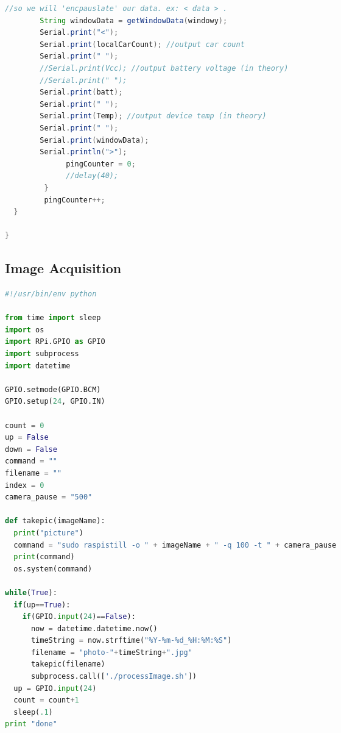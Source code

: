 \documentclass[11pt, oneside, fullpage, doublespace]{article}
\begin{document}
\begin{spacing}{1}
\begin{lstlisting}[language=java]
        //so we will 'encpauslate' our data. ex: < data > .
        String windowData = getWindowData(windowy);
        Serial.print("<");
        Serial.print(localCarCount); //output car count
        Serial.print(" ");
        //Serial.print(Vcc); //output battery voltage (in theory)
        //Serial.print(" ");
        Serial.print(batt);
        Serial.print(" ");
        Serial.print(Temp); //output device temp (in theory)
        Serial.print(" ");
        Serial.print(windowData);
        Serial.println(">");
              pingCounter = 0;
              //delay(40);
         }
         pingCounter++;  
  }

}
\end{lstlisting}
\end{spacing}

\subsection*{Image Acquisition}
\begin{spacing}{1}
\begin{lstlisting}[language=python]
#!/usr/bin/env python

from time import sleep
import os
import RPi.GPIO as GPIO
import subprocess
import datetime

GPIO.setmode(GPIO.BCM)
GPIO.setup(24, GPIO.IN)

count = 0
up = False
down = False
command = ""
filename = ""
index = 0
camera_pause = "500"

def takepic(imageName):
  print("picture")
  command = "sudo raspistill -o " + imageName + " -q 100 -t " + camera_pause
  print(command)
  os.system(command)
  
while(True):
  if(up==True):
    if(GPIO.input(24)==False):
      now = datetime.datetime.now()
      timeString = now.strftime("%Y-%m-%d_%H:%M:%S")
      filename = "photo-"+timeString+".jpg"
      takepic(filename)
      subprocess.call(['./processImage.sh'])
  up = GPIO.input(24)
  count = count+1
  sleep(.1)
print "done"

\end{lstlisting}
\end{spacing}      
\end{document}
